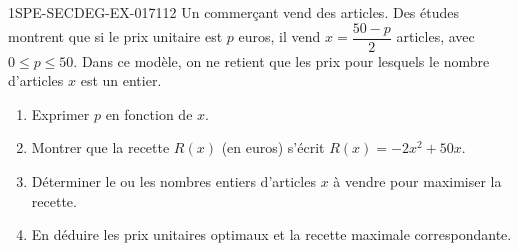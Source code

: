 \begin{exercice}{1SPE-SECDEG-EX-017}{1}{12}
Un commerçant vend des articles. Des études montrent que si le prix unitaire est $p$ euros, il vend $x = \dfrac{50 - p}{2}$ articles, avec $0 \leqslant p \leqslant 50$.
Dans ce modèle, on ne retient que les prix pour lesquels le nombre d'articles
$x$ est un entier.

\begin{enumerate}
  \item Exprimer $p$ en fonction de $x$.
  \item Montrer que la recette $R(x)$ (en euros) s'écrit $R(x) = -2x^2 + 50x$.
  \item Déterminer le ou les nombres entiers d'articles $x$ à vendre pour maximiser la recette.
  \item En déduire les prix unitaires optimaux et la recette maximale correspondante.
\end{enumerate}
\end{exercice}
